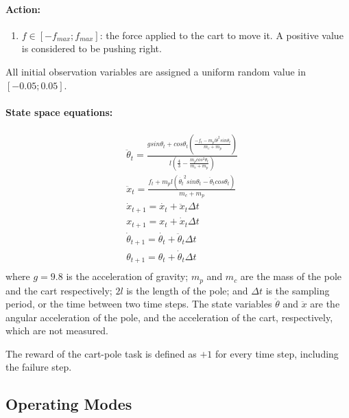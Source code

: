 \documentclass{article}
\begin{document}
\paragraph{Action:}

\begin{enumerate}
\item $f \in [-f_{max}; f_{max}] $: the force applied to the cart to move it. A positive value is considered to be pushing right.
\end{enumerate}

All initial observation variables are assigned a uniform random value in $[-0.05; 0.05]$.

\paragraph{State space equations:}

\begin{equation}
\begin{aligned}
&\ddot{\theta}_t = \frac{g sin\theta_t + cos\theta_t (\frac{-f_t - m_p l \dot{\theta}^2sin\theta_t}{m_c + m_p})}{l(\frac{4}{3} - \frac{m_p cos^2\theta_t}{m_c + m_p})}\\
&\ddot{x}_t = \frac{f_t + m_p l (\dot{\theta_t}^2sin\theta_t - \ddot{\theta}_t cos\theta_t)}{m_c + m_p}\\
&\dot{x}_{t+1} = \dot{x_t} + \ddot{x}_t \Delta t\\
&x_{t+1} = x_t + \dot{x}_t \Delta t\\
&\dot{\theta}_{t+1} = \dot{\theta_t} + \ddot{\theta}_t \Delta t\\
&\theta_{t+1} = \theta_t + \dot{\theta}_t \Delta t\\
\end{aligned}
\end{equation}
where $g = 9.8$ is the acceleration of gravity; $m_p$ and $m_c$ are the mass of the pole and the cart respectively; $2l$ is the length of the pole; and $\Delta t$ is the sampling period, or the time between two time steps. The state variables $\ddot{\theta}$ and $\ddot{x}$ are the angular acceleration of the pole, and the acceleration of the cart, respectively, which are not measured.

The reward of the cart-pole task is defined as $+1$ for every time step, including the failure step.

\subsection{Operating Modes}
\end{document}
